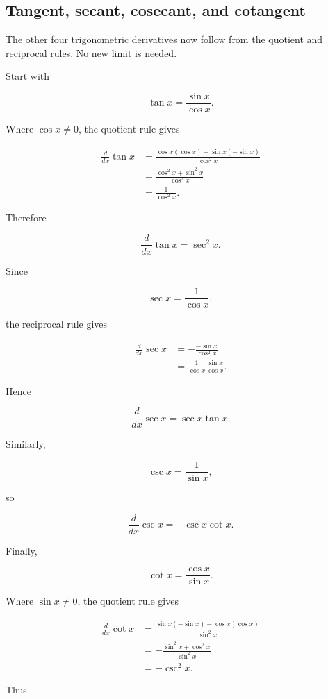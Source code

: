 \subsection{Tangent, secant, cosecant, and cotangent}
\label{subsec:deriv-other-trig}

The other four trigonometric derivatives now follow from the quotient and reciprocal
rules. No new limit is needed.

Start with

\[
\tan x=\frac{\sin x}{\cos x}.
\]

Where \(\cos x\neq0\), the quotient rule gives

\begin{align*}
\frac{d}{dx}\tan x
&=
\frac{\cos x(\cos x)-\sin x(-\sin x)}{\cos^2x}
\\
&=
\frac{\cos^2x+\sin^2x}{\cos^2x}
\\
&=
\frac1{\cos^2x}.
\end{align*}

Therefore

\[
\boxed{
\frac{d}{dx}\tan x=\sec^2x.
}
\]

Since

\[
\sec x=\frac1{\cos x},
\]

the reciprocal rule gives

\begin{align*}
\frac{d}{dx}\sec x
&=
-\frac{-\sin x}{\cos^2x}
\\
&=
\frac1{\cos x}\frac{\sin x}{\cos x}.
\end{align*}

Hence

\[
\boxed{
\frac{d}{dx}\sec x=\sec x\tan x.
}
\]

Similarly,

\[
\csc x=\frac1{\sin x},
\]

so

\[
\boxed{
\frac{d}{dx}\csc x=-\csc x\cot x.
}
\]

Finally,

\[
\cot x=\frac{\cos x}{\sin x}.
\]

Where \(\sin x\neq0\), the quotient rule gives

\begin{align*}
\frac{d}{dx}\cot x
&=
\frac{\sin x(-\sin x)-\cos x(\cos x)}{\sin^2x}
\\
&=
-\frac{\sin^2x+\cos^2x}{\sin^2x}
\\
&=
-\csc^2x.
\end{align*}

Thus

